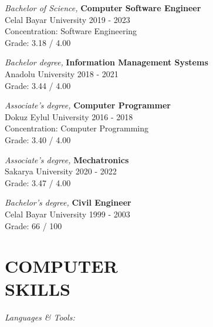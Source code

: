 \documentclass[line,margin]{res}
\begin{document}
\begin{resume}
                {\sl Bachelor of Science,} \textbf{Computer Software Engineer} \\
                Celal Bayar University 
                2019 - 2023 \\
                Concentration: Software Engineering \\
                Grade: 3.18 / 4.00 
                
                {\sl Bachelor degree,} \textbf{Information Management Systems} \\
                Anadolu University 
                2018 - 2021 \\
                Grade: 3.44 / 4.00 

                {\sl Associate's degree,} \textbf{Computer Programmer} \\
                Dokuz Eylul University 
                2016 - 2018 \\
                Concentration: Computer Programming \\
                Grade: 3.40 / 4.00 
 
                {\sl Associate's degree,} \textbf{Mechatronics} \\
                Sakarya University 
                2020 - 2022 \\
                Grade: 3.47 / 4.00 

                {\sl Bachelor's degree,} \textbf{Civil Engineer} \\
                Celal Bayar University 
                1999 - 2003 \\
                Grade: 66 / 100 \\ 
\linebreak
\section{COMPUTER \\ SKILLS} {\sl Languages \& Tools:} \\
                

\end{resume}
\end{document}
